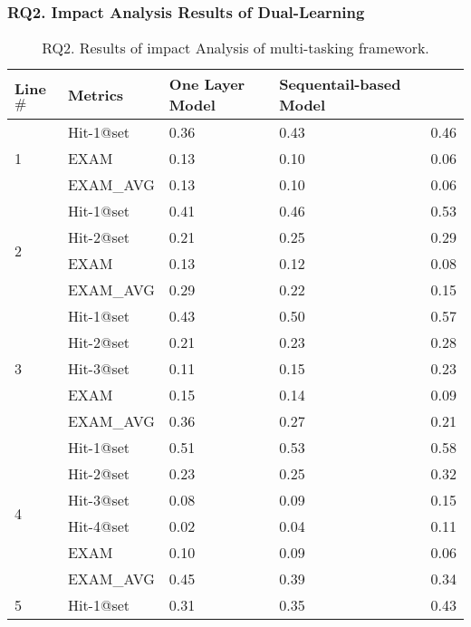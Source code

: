 \subsubsection{\bf RQ2. Impact Analysis Results of Dual-Learning}

\iffalse

\begin{table}[b]
	\caption{RQ2. Results of impact Analysis of multi-tasking framework.}
	{\small
		\begin{center}
			\renewcommand{\arraystretch}{1}
			\begin{tabular}{p{1cm}<{\centering}|p{1.5cm}<{\centering}|p{1.5cm}<{\centering}|p{1.5cm}<{\centering}|p{1.2cm}<{\centering}}
				\hline
				Line$\#$ & Metrics & One Layer Model & Sequentail-based Model & \tool \\
				\hline
				\multirow{3}{*}{1}  & Hit-1@set     & 0.36 & 0.43 & 0.46  \\
									& EXAM          & 0.13 & 0.10 & 0.06  \\
									& EXAM\_AVG     & 0.13 & 0.10 & 0.06  \\
				\hline
				\multirow{4}{*}{2}  & Hit-1@set     & 0.41 & 0.46 & 0.53  \\
									& Hit-2@set     & 0.21 & 0.25 & 0.29  \\
									& EXAM          & 0.13 & 0.12 & 0.08  \\
									& EXAM\_AVG     & 0.29 & 0.22 & 0.15 \\
				\hline
				\multirow{5}{*}{3}  & Hit-1@set     & 0.43 & 0.50 & 0.57 \\
									& Hit-2@set     & 0.21 & 0.23 & 0.28 \\
									& Hit-3@set     & 0.11 & 0.15 & 0.23 \\
									& EXAM          & 0.15 & 0.14 & 0.09 \\
									& EXAM\_AVG     & 0.36 & 0.27 & 0.21 \\
				\hline
				\multirow{6}{*}{4}  & Hit-1@set     & 0.51 & 0.53 & 0.58 \\
									& Hit-2@set     & 0.23 & 0.25 & 0.32 \\
									& Hit-3@set     & 0.08 & 0.09 & 0.15 \\
									& Hit-4@set     & 0.02 & 0.04 & 0.11 \\
									& EXAM          & 0.10 & 0.09 & 0.06 \\
									& EXAM\_AVG     & 0.45 & 0.39 & 0.34 \\
				\hline
				\multirow{7}{*}{5}  & Hit-1@set     & 0.31 & 0.35 & 0.43 \\

\end{tabular}
\end{center}}
\end{table}

